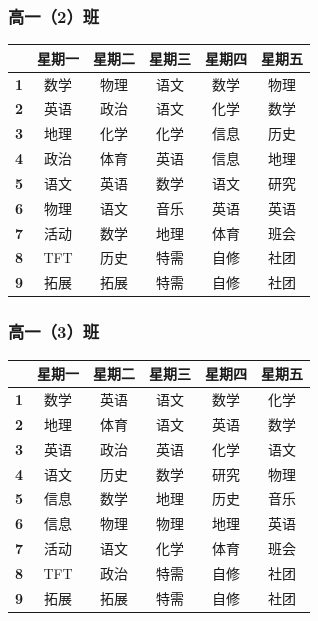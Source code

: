 \documentclass[a4paper]{article}
\begin{document}
  \subsubsection{高一（2）班}

   \begin{tabular}{cccccc}
   \toprule
   & \bf 星期一 & \bf 星期二 & \bf 星期三 & \bf 星期四 & \bf 星期五 \\
   \midrule
   \bf 1 & 数学 & 物理 & 语文 & 数学 & 物理 \\
   \bf 2 & 英语 & 政治 & 语文 & 化学 & 数学 \\
   \bf 3 & 地理 & 化学 & 化学 & 信息 & 历史 \\
   \bf 4 & 政治 & 体育 & 英语 & 信息 & 地理 \\
   \bf 5 & 语文 & 英语 & 数学 & 语文 & 研究 \\
   \midrule
   \bf 6 & 物理 & 语文 & 音乐 & 英语 & 英语 \\
   \bf 7 & 活动 & 数学 & 地理 & 体育 & 班会 \\
   \bf 8 & TFT  & 历史 & 特需 & 自修 & 社团 \\
   \bf 9 & 拓展 & 拓展 & 特需 & 自修 & 社团 \\
   \bottomrule
   \end{tabular}

  \subsubsection{高一（3）班}

   \begin{tabular}{cccccc}
   \toprule
   & \bf 星期一 & \bf 星期二 & \bf 星期三 & \bf 星期四 & \bf 星期五 \\
   \midrule
   \bf 1 & 数学 & 英语 & 语文 & 数学 & 化学 \\
   \bf 2 & 地理 & 体育 & 语文 & 英语 & 数学 \\
   \bf 3 & 英语 & 政治 & 英语 & 化学 & 语文 \\
   \bf 4 & 语文 & 历史 & 数学 & 研究 & 物理 \\
   \bf 5 & 信息 & 数学 & 地理 & 历史 & 音乐 \\
   \midrule
   \bf 6 & 信息 & 物理 & 物理 & 地理 & 英语 \\
   \bf 7 & 活动 & 语文 & 化学 & 体育 & 班会 \\
   \bf 8 & TFT  & 政治 & 特需 & 自修 & 社团 \\
   \bf 9 & 拓展 & 拓展 & 特需 & 自修 & 社团 \\
   \bottomrule
   \end{tabular}
\end{document}
